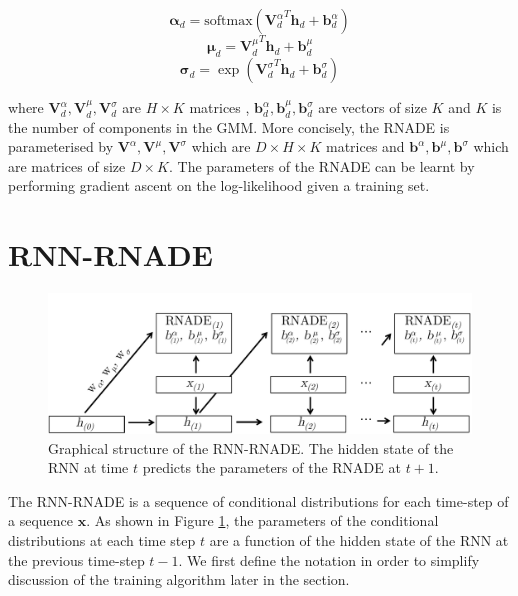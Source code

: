 \documentclass{article} %
\begin{document}
$$ \boldsymbol{\alpha}_d = \text{softmax} ({\mathbf{V}_{d}^{\alpha}}^T \mathbf{h}_d + \mathbf{b}^{\alpha}_{d})$$
$$ \boldsymbol{\mu}_d = {\mathbf{V}_{d}^{\mu}}^T \mathbf{h}_d + \mathbf{b}^{\mu}_{d}$$
$$ \boldsymbol{\sigma}_d = \exp ({\mathbf{V}_{d}^{\sigma}}^T \mathbf{h}_d + \mathbf{b}^{\sigma}_{d})$$

where $ \mathbf{V}_{d}^{\alpha},\mathbf{V}_{d}^{\mu},\mathbf{V}_{d}^{\sigma}$ are $H \times K$ matrices , $\mathbf{b}^{\alpha}_{d},\mathbf{b}^{\mu}_{d},\mathbf{b}^{\sigma}_{d}$ are vectors of size $K$ and $K$ is the number of components in the GMM. More concisely, the RNADE is parameterised by $\mathbf{V}^{\alpha},\mathbf{V}^{\mu},\mathbf{V}^{\sigma}$ which are $D \times H \times K$ matrices and $\mathbf{b}^{\alpha},\mathbf{b}^{\mu},\mathbf{b}^{\sigma}$ which are matrices of size $D \times K $.
The parameters of the RNADE can be learnt by performing gradient ascent on the log-likelihood given a training set. 

\section{RNN-RNADE}
\label{RNN-RNADE}

\begin{figure}
	\centering
    \includegraphics[scale=0.65]{RNN-RNADE.pdf}
    \caption{Graphical structure of the RNN-RNADE. The hidden state of the RNN at time $t$ predicts the parameters of the RNADE at $t+1$. }
    \label{fig:rnn-rnade}
\end{figure}


The RNN-RNADE is a sequence of conditional distributions for each time-step of a sequence $\mathbf{x}$. As shown in Figure \ref{fig:rnn-rnade}, the parameters of the conditional distributions at each time step $t$ are a function of the hidden state of the RNN at the previous time-step $t-1$. We first define the notation in order to simplify discussion of the training algorithm later in the section. 
\end{document}
